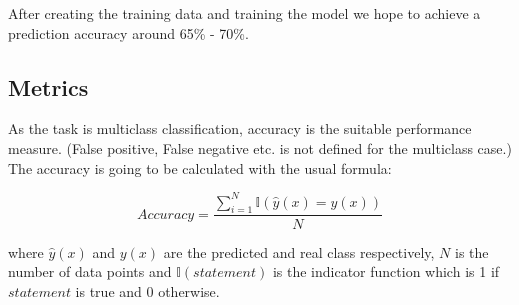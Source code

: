 After creating the training data and training the model we hope to achieve a prediction accuracy around 65\% - 70\%.

\subsection{Metrics} \label{sec1.3}

As the task is multiclass classification, accuracy is the suitable performance measure. (False positive, False negative etc. is not defined for the multiclass case.) The accuracy is going to be calculated with the usual formula:

$$Accuracy = \frac{\sum_{i=1}^{N}\mathbb{I}\left(\hat{y}(x) = y(x)\right)}{N}$$

where $\hat{y}(x)$ and $y(x)$ are the predicted and real class respectively, $N$ is the number of data points and $\mathbb{I}(statement)$ is the indicator function which is 1 if $statement$ is true and 0 otherwise.
